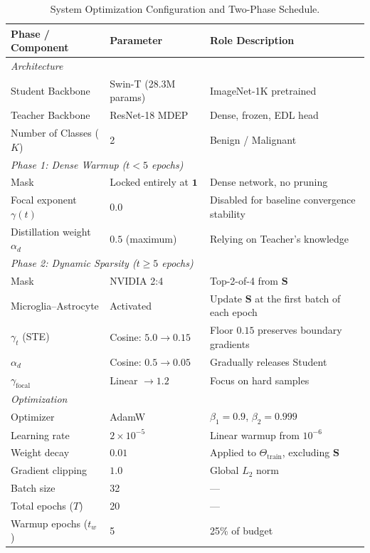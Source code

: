 \documentclass[11pt]{article}
\begin{document}
\begin{table}[H]
\centering
\caption{System Optimization Configuration and Two-Phase Schedule.}
\label{tab:config}
\begin{tabular}{@{}lll@{}}
\toprule
\textbf{Phase / Component} & \textbf{Parameter} & \textbf{Role Description} \\
\midrule
\multicolumn{3}{l}{\emph{Architecture}} \\
Student Backbone & Swin-T (28.3M params) & ImageNet-1K pretrained \\
Teacher Backbone & ResNet-18 MDEP & Dense, frozen, EDL head \\
Number of Classes ($K$) & 2 & Benign / Malignant \\
\midrule
\multicolumn{3}{l}{\emph{Phase 1: Dense Warmup ($t < 5$ epochs)}} \\
Mask & Locked entirely at $\bm{1}$ & Dense network, no pruning \\
Focal exponent $\gamma(t)$ & $0.0$ & Disabled for baseline convergence stability \\
Distillation weight $\alpha_d$ & $0.5$ (maximum) & Relying on Teacher's knowledge \\
\midrule
\multicolumn{3}{l}{\emph{Phase 2: Dynamic Sparsity ($t \ge 5$ epochs)}} \\
Mask & NVIDIA 2:4 & Top-2-of-4 from $\bm{S}$ \\
Microglia--Astrocyte & Activated & Update $\bm{S}$ at the first batch of each epoch \\
$\gamma_t$ (STE) & Cosine: $5.0 \to 0.15$ & Floor $0.15$ preserves boundary gradients \\
$\alpha_d$ & Cosine: $0.5 \to 0.05$ & Gradually releases Student \\
$\gamma_{\text{focal}}$ & Linear $\to 1.2$ & Focus on hard samples \\
\midrule
\multicolumn{3}{l}{\emph{Optimization}} \\
Optimizer & AdamW~\cite{loshchilov2019decoupled, kingma2015adam} & $\beta_1=0.9$, $\beta_2=0.999$ \\
Learning rate & $2 \times 10^{-5}$ & Linear warmup from $10^{-6}$ \\
Weight decay & $0.01$ & Applied to $\Theta_{\text{train}}$, excluding $\bm{S}$ \\
Gradient clipping & $1.0$ & Global $L_2$ norm \\
Batch size & 32 & --- \\
Total epochs ($T$) & 20 & --- \\
Warmup epochs ($t_w$) & 5 & 25\% of budget \\

\end{tabular}
\end{table}
\end{document}
